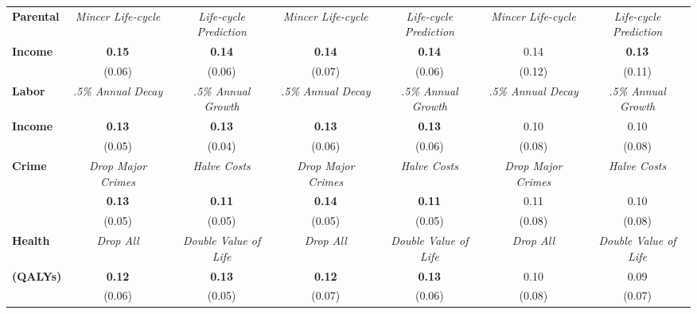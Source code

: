 \begin{tabular}{>{\bfseries}lcc|cc|cc}
Parental	&	\textit{Mincer Life-cycle}	&	\textit{Life-cycle Prediction}	&	\textit{Mincer Life-cycle}	&	\textit{Life-cycle Prediction}	&	\textit{Mincer Life-cycle}	&	\textit{Life-cycle Prediction}	\\
Income	&	\textbf{0.15}	&	\textbf{0.14}	&	\textbf{0.14}	&	\textbf{0.14}	&	0.14	&	\textbf{0.13}	\\
	&	(0.06)	&	(0.06)	&	(0.07)	&	(0.06)	&	(0.12)	&	(0.11)	\\ \midrule
Labor	&	\textit{.5\% Annual Decay}	&	\textit{.5\% Annual Growth}	&	\textit{.5\% Annual Decay}	&	\textit{.5\% Annual Growth}	&	\textit{.5\% Annual Decay}	&	\textit{.5\% Annual Growth}	\\
Income	&	\textbf{0.13}	&	\textbf{0.13}	&	\textbf{0.13}	&	\textbf{0.13}	&	0.10	&	0.10	\\
	&	(0.05)	&	(0.04)	&	(0.06)	&	(0.06)	&	(0.08)	&	(0.08)	\\ \midrule
Crime	&	\textit{Drop Major Crimes}	&	\textit{Halve Costs}	&	\textit{Drop Major Crimes}	&	\textit{Halve Costs}	&	\textit{Drop Major Crimes}	&	\textit{Halve Costs}	\\
	&	\textbf{0.13}	&	\textbf{0.11}	&	\textbf{0.14}	&	\textbf{0.11}	&	0.11	&	0.10	\\
	&	(0.05)	&	(0.05)	&	(0.05)	&	(0.05)	&	(0.08)	&	(0.08)	\\ \midrule
Health	&	\textit{Drop All}	&	\textit{Double Value of Life}	&	\textit{Drop All}	&	\textit{Double Value of Life}	&	\textit{Drop All}	&	\textit{Double Value of Life}	\\
(QALYs)	&	\textbf{0.12}	&	\textbf{0.13}	&	\textbf{0.12}	&	\textbf{0.13}	&	0.10	&	0.09	\\
	&	(0.06)	&	(0.05)	&	(0.07)	&	(0.06)	&	(0.08)	&	(0.07)	\\ \bottomrule
\end{tabular} 